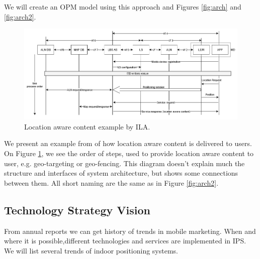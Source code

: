 We will create an OPM model using this approach and Figures \ref{fig:arch} and \ref{fig:arch2}.

\begin{figure}[ht]
	\centering
	\includegraphics[width=\textwidth]{graphics/roadmap/location aware content by ILA.png}
	\caption{Location aware content example by ILA.}
	\label{fig:loc_aware}
\end{figure}

We present an example from \cite{ILA-System-Architecture} of how location aware content is delivered to users.
On Figure \ref{fig:loc_aware}, we see the order of steps, used to provide location aware content to user, e.g. geo-targeting or geo-fencing. This diagram doesn't explain much the structure and interfaces of system architecture, but shows some connections between them. All short naming are the same as in Figure \ref{fig:arch2}.




\subsection{Technology Strategy Vision}


From annual reports\cite{trends2017,trends2019} we can get history of trends in mobile marketing. When and where it is possible,different technologies and services are implemented in IPS. We will list several trends of indoor positioning systems.


